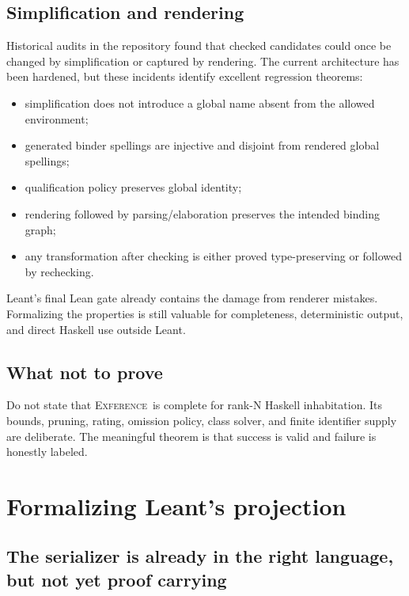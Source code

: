 \documentclass[11pt,letterpaper,openany]{report}
\theoremstyle{definition}
\theoremstyle{remark}
\newcommand{\Exference}{\textsc{Exference}}
\begin{document}
\section{Simplification and rendering}

Historical audits in the repository found that checked candidates could once be changed by simplification or captured by rendering. The current architecture has been hardened, but these incidents identify excellent regression theorems:

\begin{itemize}
\item simplification does not introduce a global name absent from the allowed environment;
\item generated binder spellings are injective and disjoint from rendered global spellings;
\item qualification policy preserves global identity;
\item rendering followed by parsing/elaboration preserves the intended binding graph;
\item any transformation after checking is either proved type-preserving or followed by rechecking.
\end{itemize}

Leant's final Lean gate already contains the damage from renderer mistakes. Formalizing the properties is still valuable for completeness, deterministic output, and direct Haskell use outside Leant.

\section{What not to prove}

Do not state that \Exference\ is complete for rank-N Haskell inhabitation. Its bounds, pruning, rating, omission policy, class solver, and finite identifier supply are deliberate. The meaningful theorem is that success is valid and failure is honestly labeled.

\chapter{Formalizing Leant's projection}
\label{ch:projection}

\section{The serializer is already in the right language, but not yet proof carrying}
\end{document}
